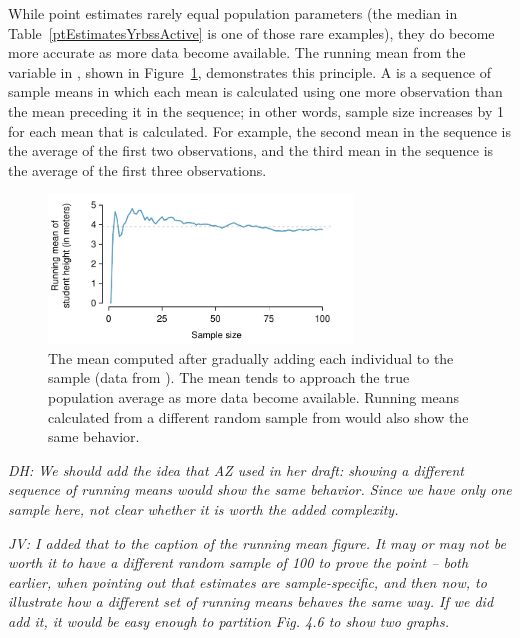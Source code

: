 \begin{spacing}{1.5}
While point estimates rarely equal population parameters (the median in Table~\ref{ptEstimatesYrbssActive} is one of those rare examples), they do become more accurate as more data become available. The running mean from the variable  in , shown in Figure~\ref{yrbssActiveRunningMean}, demonstrates this principle. A  is a sequence of sample means in which each mean is calculated using one more observation than the mean preceding it in the sequence; in other words, sample size increases by 1 for each mean that is calculated. For example, the second mean in the sequence is the average of the first two observations, and the third mean in the sequence is the average of the first three observations. 

\begin{figure}[h]
   \centering
   \includegraphics[width=0.72\textwidth]{ch_inference_foundations_oi_biostat/figures/yrbssActiveRunningMean/yrbssActiveRunningMean}
   \caption{The mean computed after gradually adding each individual to the sample (data from ). The mean tends to approach the true population average as more data become available. Running means calculated from a different random sample from  would also show the same behavior.}
   \label{yrbssActiveRunningMean}
\end{figure}

\textit{DH: We should add the idea that AZ used in her draft: showing a different sequence of running means would show the same behavior.  Since we have only one sample here, not clear whether it is worth the added complexity.}

\textit{JV: I added that to the caption of the running mean figure. It may or may not be worth it to have a different random sample of 100 to prove the point -- both earlier, when pointing out that estimates are sample-specific, and then now, to illustrate how a different set of running means behaves the same way. If we did add it, it would be easy enough to partition Fig. 4.6 to show two graphs.}


\end{spacing}
